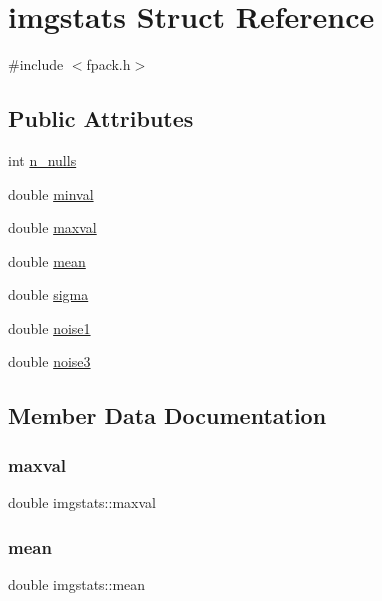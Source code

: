 \hypertarget{structimgstats}{}\section{imgstats Struct Reference}
\label{structimgstats}


{\ttfamily \#include $<$fpack.\+h$>$}

\subsection*{Public Attributes}
\begin{DoxyCompactItemize}
\item 
int \hyperlink{structimgstats_aaa7516571b9f0394a90a8d6508063e57}{n\+\_\+nulls}
\item 
double \hyperlink{structimgstats_a333178e1fbb17f91f9abd19f0b1ab0e8}{minval}
\item 
double \hyperlink{structimgstats_afb0ec86389d3cf0f5e453eec53e8277b}{maxval}
\item 
double \hyperlink{structimgstats_ad2c432ef3dd35f8337eeb52c3af2a29a}{mean}
\item 
double \hyperlink{structimgstats_a02077258ade4f34ff74082918e57cc0b}{sigma}
\item 
double \hyperlink{structimgstats_a4653067a86105aff24f93784a46dc3b8}{noise1}
\item 
double \hyperlink{structimgstats_a60b34c6148a4aa3aa344925efe0b60df}{noise3}
\end{DoxyCompactItemize}


\subsection{Member Data Documentation}
\mbox{\label{structimgstats_afb0ec86389d3cf0f5e453eec53e8277b}} 
\subsubsection{\texorpdfstring{maxval}{maxval}}
{\footnotesize\ttfamily double imgstats\+::maxval}

\mbox{\label{structimgstats_ad2c432ef3dd35f8337eeb52c3af2a29a}} 
\subsubsection{\texorpdfstring{mean}{mean}}
{\footnotesize\ttfamily double imgstats\+::mean}

